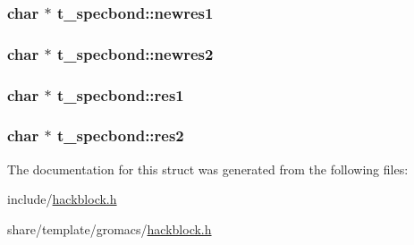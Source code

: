 \hypertarget{structt__specbond_abddca48c89c038ceab7f978da8d16e02}{
\subsubsection[{newres1}]{\setlength{\rightskip}{0pt plus 5cm}char $\ast$ {\bf t\-\_\-specbond\-::newres1}}}\label{structt__specbond_abddca48c89c038ceab7f978da8d16e02}
\hypertarget{structt__specbond_a1377197019ff7ce02c4148d9a916742e}{
\subsubsection[{newres2}]{\setlength{\rightskip}{0pt plus 5cm}char $\ast$ {\bf t\-\_\-specbond\-::newres2}}}\label{structt__specbond_a1377197019ff7ce02c4148d9a916742e}
\hypertarget{structt__specbond_a2f4282a04a0e3f8f659256346d3a988b}{
\subsubsection[{res1}]{\setlength{\rightskip}{0pt plus 5cm}char $\ast$ {\bf t\-\_\-specbond\-::res1}}}\label{structt__specbond_a2f4282a04a0e3f8f659256346d3a988b}
\hypertarget{structt__specbond_a9c34c71a63b58ce3d4e1d528c7e20a4a}{
\subsubsection[{res2}]{\setlength{\rightskip}{0pt plus 5cm}char $\ast$ {\bf t\-\_\-specbond\-::res2}}}\label{structt__specbond_a9c34c71a63b58ce3d4e1d528c7e20a4a}


\-The documentation for this struct was generated from the following files\-:\begin{DoxyCompactItemize}
\item 
include/\hyperlink{include_2hackblock_8h}{hackblock.\-h}\item 
share/template/gromacs/\hyperlink{share_2template_2gromacs_2hackblock_8h}{hackblock.\-h}\end{DoxyCompactItemize}
